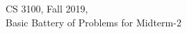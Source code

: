 \documentclass[12pt]{article}
\begin{document}



\begin{center}
\begin{large}
  CS 3100, Fall 2019, \\
  Basic Battery of Problems for Midterm-2
\end{large}
\end{center}

\date{}

\end{document}
